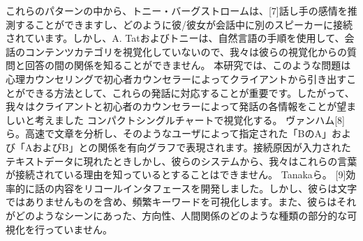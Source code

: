 \documentclass[shuuron]{kuee}
\begin{document}
 これらのパターンの中から、トニー・バーグストロームは、[7]話し手の感情を推測することができますし、どのように彼/彼女が会話中に別のスピーカーに接続されています。しかし、A. Tatおよびトニーは、自然言語の手順を使用して、会話のコンテンツカテゴリを視覚化していないので、我々は彼らの視覚化からの質問と回答の間の関係を知ることができません。
  本研究では、このような問題は心理カウンセリングで初心者カウンセラーによってクライアントから引き出すことができる方法として、これらの発話に対応することが重要です。したがって、我々はクライアントと初心者のカウンセラーによって発話の各情報をことが望ましいと考えました コンパクトシングルチャートで視覚化する。
  ヴァンハム[8]ら。高速で文章を分析し、そのようなユーザによって指定された「BのA」および「AおよびB」との関係を有向グラフで表現されます。接続原因が入力されたテキストデータに現れたときしかし、彼らのシステムから、我々はこれらの言葉が接続されている理由を知っているとすることはできません。
  Tanakaら。 [9]効率的に話の内容をリコールインタフェースを開発しました。しかし、彼らは文字ではありませんものを含め、頻繁キーワードを可視化します。また、彼らはそれがどのようなシーンにあった、方向性、人間関係のどのような種類の部分的な可視化を行っていません。

\end{document}

